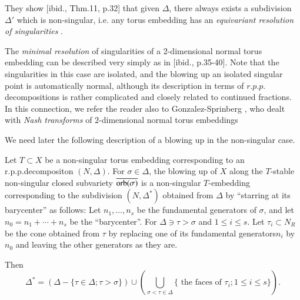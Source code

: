  They show [ibid., Thm.11, p.32] that given $\Delta$, there always
 exists a subdivision $\Delta'$ which is non-singular, i.e. any torus
 embedding has an \textit{equivariant resolution of singularities }.   
 
 The \textit{minimal resolution} of singularities of a 2-dimensional
 normal torus embedding can be described very simply as in [ibid.,
   p.35-40]. Note that the singularities in this case are isolated,
 and the blowing up an isolated singular point is automatically
 normal, although its description in terms of $r.p.p$. decompositions
 is rather complicated and closely related to continued fractions. In
 this connection, we refer the reader also to Gonzalez-Sprinberg
 \cite{keyG2}, who dealt with \textit{ Nash transforms } of $2$-dimensional
 normal torus embeddings 
 
We need later the following description of a blowing up in the 
 non-singular case. 
 
 \begin{prop}\label{chap1:prop7.4}%
Let $T \subset X$ be a non-singular torus embedding corresponding to an
r.p.p.decompositon $(N, \Delta)$. For $\sigma \in \Delta$, the
blowing up of $X$ along the $T$-stable non-singular closed subvariety
$\overline{\operatorname{orb}(\sigma)}$ is a non-singular $T$-embedding
corresponding to the subdivision $(N, \Delta^*)$ obtained from
$\Delta$ by ``starring at its barycenter'' as follows: Let $n_1,
\ldots , n_s$ be the fundamental generators of $\sigma$, and let $n_0
=n_1 + \cdots + n_s$ be the ``barycenter''. For $ \Delta \ni \tau >
\sigma$ and $1 \leq i \leq s$. Let $\tau_i \subset N_R$ be the cone
obtained from $\tau$ by replacing one of its fundamental
generators\pageoriginale $n_i$ by $n_0$ and leaving the other
generators as they are.  
 \end{prop} 
 
\noindent
Then   
$$
\Delta^*=( \Delta- \{\tau \in \Delta; \tau > \sigma\}) \cup(
\bigcup_{\sigma < \tau \in \Delta} \{ \text{ the faces of } \tau_i ;1
\le i \le s \} ). 
$$

